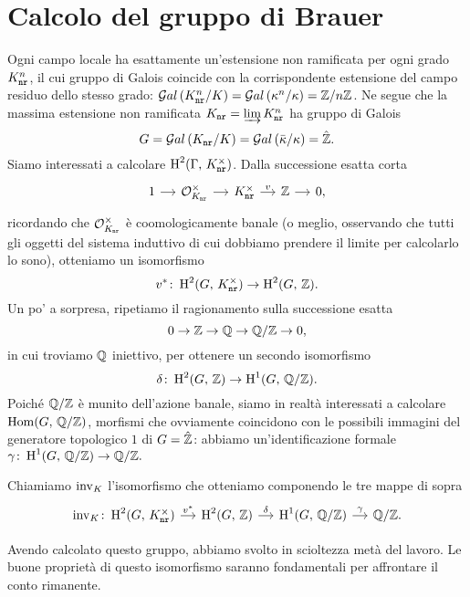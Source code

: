 \section{Calcolo del gruppo di Brauer}
Ogni campo locale ha esattamente un'estensione non ramificata per ogni grado $ K_\mathtt{nr}^n $, il cui gruppo di Galois coincide con la corrispondente estensione del campo residuo dello stesso grado: $ \mathcal{G}al\left( K^n_\texttt{nr} / K \right) = \mathcal{G}al\left( \kappa^n / \kappa \right) = \mathbb{Z} / n\mathbb{Z} $. Ne segue che la massima estensione non ramificata $ K_\mathtt{nr} = \varinjlim K^n_\texttt{nr} $ ha gruppo di Galois
\[ G = \mathcal{G}al\left( K_\mathtt{nr} / K \right) = \mathcal{G}al\left( \bar{\kappa} / \kappa \right) = \hat{\mathbb{Z}}. \]
Siamo interessati a calcolare $ \operatorname{H}^2(\Gamma, \, K_\mathtt{nr}^\times) $. Dalla successione esatta corta
\[ \begin{tikzcd}[column sep = small]
1 \rar
& \mathcal{O}_{\knr}^\times \rar
& \knr^\times \rar["v"]
& \Z \rar
& 0,
\end{tikzcd} \]
ricordando che $ \mathcal{O}_{K_\mathtt{nr}}^\times $ è coomologicamente banale (o meglio, osservando che tutti gli oggetti del sistema induttivo di cui dobbiamo prendere il limite per calcolarlo lo sono), otteniamo un isomorfismo
\[ v^* \colon \operatorname{H}^2(G, \, K_\mathtt{nr}^\times) \to \operatorname{H}^2(G, \, \mathbb{Z}). \]
Un po' a sorpresa, ripetiamo il ragionamento sulla successione esatta
\[ 0 \to \mathbb{Z} \to \mathbb{Q} \to \mathbb{Q}/\mathbb{Z} \to 0, \]
in cui troviamo $ \mathbb{Q} $ iniettivo, per ottenere un secondo isomorfismo
\[ \delta \colon \operatorname{H}^2(G, \, \mathbb{Z}) \to \operatorname{H}^1(G, \, \mathbb{Q}/\mathbb{Z}). \]
Poiché $ \mathbb{Q}/\mathbb{Z} $ è munito dell'azione banale, siamo in realtà interessati a calcolare $ \operatorname{Hom}(G, \, \mathbb{Q}/\mathbb{Z}) $, morfismi che ovviamente coincidono con le possibili immagini del generatore topologico $ 1 $ di $ G = \hat{\mathbb{Z}} $: abbiamo un'identificazione formale $ \gamma \colon \operatorname{H}^1(G, \, \mathbb{Q}/\mathbb{Z}) \to \mathbb{Q}/\mathbb{Z}.  $

\begin{definition}
	Chiamiamo $ \operatorname{inv}_K $ l'isomorfismo che otteniamo componendo le tre mappe di sopra
	\[ \begin{tikzcd}[column sep = small]
	\inv_\K \colon \HH^2(G, \, \knr^\times)  \rar["v^*"]
	& \HH^2(G, \, \Z) \rar["\delta"]
	& \HH^1(G, \, \Q/\Z) \rar["\gamma"]
	& \Q/\Z.
	\end{tikzcd} \]
\end{definition}

Avendo calcolato questo gruppo, abbiamo svolto in scioltezza metà del lavoro. Le buone proprietà di questo isomorfismo saranno fondamentali per affrontare il conto rimanente.

